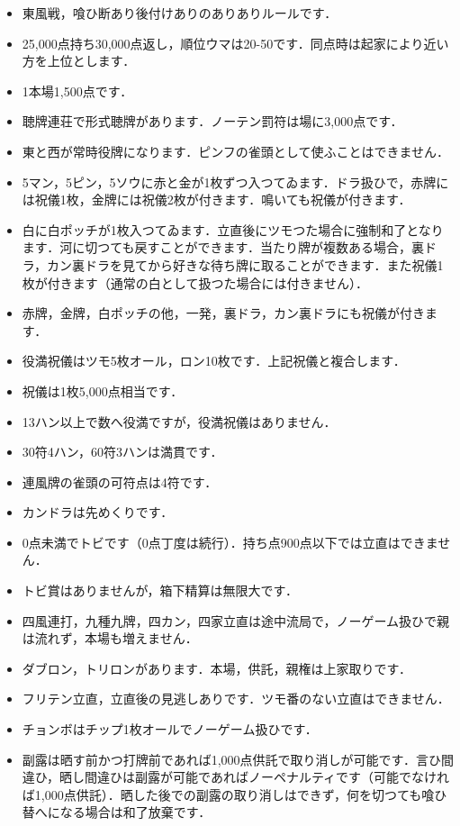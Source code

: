 \documentclass[uplatex]{jsarticle}
\begin{document}
\begin{itemize}
    \item 東風戦，喰ひ断あり後付けありのありありルールです．
    \item 25,000点持ち30,000点返し，順位ウマは20-50です．同点時は起家により近い方を上位とします．
    \item 1本場1,500点です．
    \item 聴牌連荘で形式聴牌があります．ノーテン罰符は場に3,000点です．
    \item 東と西が常時役牌になります．ピンフの雀頭として使ふことはできません．
    \item 5マン，5ピン，5ソウに赤と金が1枚ずつ入つてゐます．ドラ扱ひで，赤牌には祝儀1枚，金牌には祝儀2枚が付きます．鳴いても祝儀が付きます．
    \item 白に白ポッチが1枚入つてゐます．立直後にツモつた場合に強制和了となります．河に切つても戻すことができます．当たり牌が複数ある場合，裏ドラ，カン裏ドラを見てから好きな待ち牌に取ることができます．また祝儀1枚が付きます（通常の白として扱つた場合には付きません）．
    \item 赤牌，金牌，白ポッチの他，一発，裏ドラ，カン裏ドラにも祝儀が付きます．
    \item 役満祝儀はツモ5枚オール，ロン10枚です．上記祝儀と複合します．
    \item 祝儀は1枚5,000点相当です．
    \item 13ハン以上で数へ役満ですが，役満祝儀はありません．
    \item 30符4ハン，60符3ハンは満貫です．
    \item 連風牌の雀頭の可符点は4符です．
    \item カンドラは先めくりです．
    \item 0点未満でトビです（0点丁度は続行）．持ち点900点以下では立直はできません．
    \item トビ賞はありませんが，箱下精算は無限大です．
    \item 四風連打，九種九牌，四カン，四家立直は途中流局で，ノーゲーム扱ひで親は流れず，本場も増えません．
    \item ダブロン，トリロンがあります．本場，供託，親権は上家取りです．
    \item フリテン立直，立直後の見逃しありです．ツモ番のない立直はできません．
    \item チョンボはチップ1枚オールでノーゲーム扱ひです．
    \item 副露は晒す前かつ打牌前であれば1,000点供託で取り消しが可能です．言ひ間違ひ，晒し間違ひは副露が可能であればノーペナルティです（可能でなければ1,000点供託）．晒した後での副露の取り消しはできず，何を切つても喰ひ替へになる場合は和了放棄です．

\end{itemize}
\end{document}
